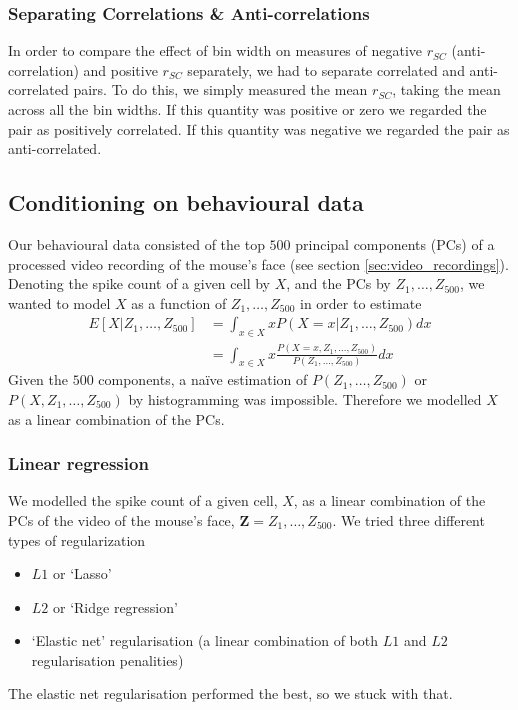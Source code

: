         \subsubsection{Separating Correlations \& Anti-correlations}\label{sec:corr_anti_corr}
        In order to compare the effect of bin width on measures of negative $r_{SC}$ (anti-correlation) and positive $r_{SC}$ separately, we had to separate correlated and anti-correlated pairs. To do this, we simply measured the mean $r_{SC}$, taking the mean across all the bin widths. If this quantity was positive or zero we regarded the pair as positively correlated. If this quantity was negative we regarded the pair as anti-correlated.

    \subsection{Conditioning on behavioural data}\label{sec:conditioning_on_behavioural_data}
    Our behavioural data consisted of the top $500$ principal components (PCs) of a processed video recording of the mouse's face (see section \ref{sec:video_recordings}). Denoting the spike count of a given cell by $X$, and the PCs by $Z_1,\dots,Z_{500}$, we wanted to model $X$ as a function of $Z_1,\dots,Z_{500}$ in order to estimate
    \begin{align}
      E[X|Z_1,\dots,Z_{500}] &= \int_{x \in X} x P(X=x | Z_1,\dots,Z_{500}) dx \\
        &= \int_{x \in X} x \frac{P(X=x, Z_1,\dots,Z_{500})}{P(Z_1,\dots,Z_{500})} dx
    \end{align}
    Given the $500$ components, a na\"{i}ve estimation of $P(Z_1,\dots,Z_{500})$ or $P(X, Z_1,\dots,Z_{500})$ by histogramming was impossible. Therefore we modelled $X$ as a linear combination of the PCs.

        \subsubsection{Linear regression}
        We modelled the spike count of a given cell, $X$, as a linear combination of the PCs of the video of the mouse's face, $\mathbf{Z} = Z_1,\dots,Z_{500}$. We tried three different types of regularization
        \begin{itemize}
            \item $L1$ or `Lasso'
            \item $L2$ or `Ridge regression'
            \item `Elastic net' regularisation (a linear combination of both $L1$ and $L2$ regularisation penalities)
        \end{itemize}
        The elastic net regularisation performed the best, so we stuck with that.

